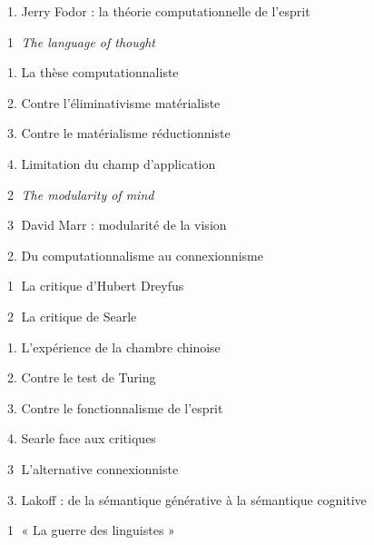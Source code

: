 \begin{keybox}
\hspace*{1em}1. Jerry Fodor : la théorie computationnelle de l’esprit\par
\hspace*{2em}\textcircled{\scriptsize 1} \emph{The language of thought}\par
\hspace*{3em}1. La thèse computationnaliste\par
\hspace*{3em}2. Contre l’éliminativisme matérialiste\par
\hspace*{3em}3. Contre le matérialisme réductionniste\par
\hspace*{3em}4. Limitation du champ d’application\par
\hspace*{2em}\textcircled{\scriptsize 2} \emph{The modularity of mind}\par
\hspace*{2em}\textcircled{\scriptsize 3} David Marr : modularité de la vision\par
\hspace*{1em}2. Du computationnalisme au connexionnisme\par
\hspace*{2em}\textcircled{\scriptsize 1} La critique d’Hubert Dreyfus\par
\hspace*{2em}\textcircled{\scriptsize 2} La critique de Searle\par
\hspace*{3em}1. L’expérience de la chambre chinoise\par
\hspace*{3em}2. Contre le test de Turing\par
\hspace*{3em}3. Contre le fonctionnalisme de l’esprit\par
{}
\hspace*{3em}4. Searle face aux critiques\par
\hspace*{2em}\textcircled{\scriptsize 3} L’alternative connexionniste\par
\hspace*{1em}3. Lakoff : de la sémantique générative à la sémantique cognitive\par
\hspace*{2em}\textcircled{\scriptsize 1} « La guerre des linguistes »\par

\end{keybox}
